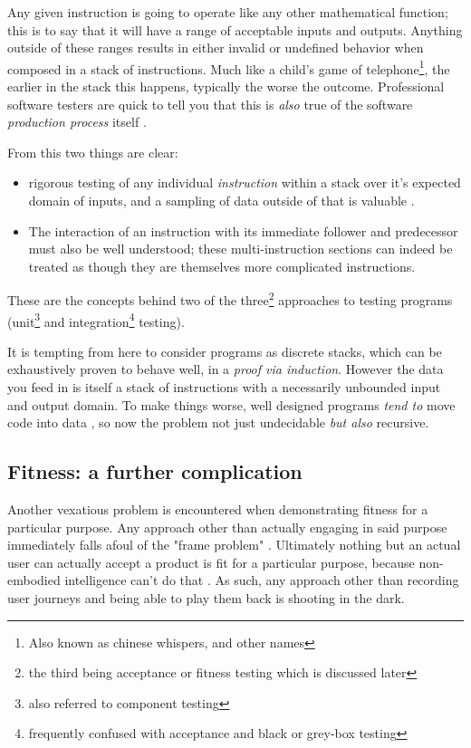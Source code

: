\documentclass{article}
\begin{document}
Any given instruction is going to operate like any other mathematical function;
this is to say that it will have a range of acceptable inputs and outputs.
Anything outside of these ranges results in either invalid or undefined behavior when composed in a stack of instructions.
Much like a child's game of telephone\footnote{Also known as chinese whispers, and other names}, the earlier in the stack this happens, typically the worse the outcome.
Professional software testers are quick to tell you that this is \textit{also} true of the software \textit{production process} itself \cite{prodprop}.

From this two things are clear:
\begin{itemize}
\item rigorous testing of any individual \textit{instruction} within a stack over it's expected domain of inputs, and a sampling of data outside of that is valuable \cite{bezier2}.
\item The interaction of an instruction with its immediate follower and predecessor must also be well understood; these multi-instruction sections can indeed be treated as though they are themselves more complicated instructions.
\end{itemize}
These are the concepts behind two of the three\footnote{the third being acceptance or fitness testing which is discussed later} approaches to testing programs (unit\footnote{also referred to component testing} and integration\footnote{frequently confused with acceptance and black or grey-box testing} testing).

It is tempting from here to consider programs as discrete stacks, which can be exhaustively proven to behave well, in a \textit{proof via induction}.
However the data you feed in is itself a stack of instructions with a necessarily unbounded input and output domain.
To make things worse, well designed programs \textit{tend to} move code into data \cite{bezier3}, so now the problem not just undecidable \cite{turing} \textit{but also} recursive.

\subsection{Fitness: a further complication}

Another vexatious problem is encountered when demonstrating fitness for a particular purpose.
Any approach other than actually engaging in said purpose immediately falls afoul of the "frame problem" \cite{frame}.
Ultimately nothing but an actual user can actually accept a product is fit for a particular purpose, because non-embodied intelligence can't do that \cite{chapman}.
As such, any approach other than recording user journeys and being able to play them back is shooting in the dark.
\end{document}
